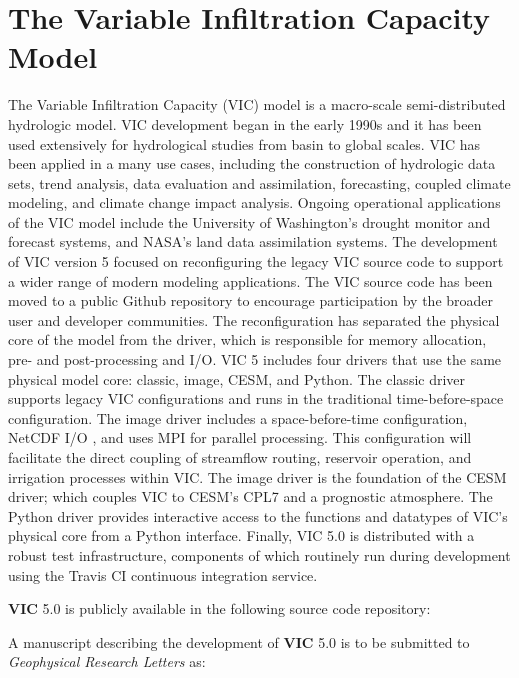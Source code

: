 \section{The Variable Infiltration Capacity Model}
\label{sec:vic_dev}
The Variable Infiltration Capacity (VIC) model is a macro-scale semi-distributed hydrologic model.
VIC development began in the early 1990s and it has been used extensively for hydrological studies from basin to global scales.
VIC has been applied in a many use cases, including the construction of hydrologic data sets, trend analysis, data evaluation and assimilation, forecasting, coupled climate modeling, and climate change impact analysis.
Ongoing operational applications of the VIC model include the University of Washington's drought monitor and forecast systems, and NASA's land data assimilation systems.
The development of VIC version 5 focused on reconfiguring the legacy VIC source code to support a wider range of modern modeling applications.
The VIC source code has been moved to a public Github repository to encourage participation by the broader user and developer communities.
The reconfiguration has separated the physical core of the model from the driver, which is responsible for memory allocation, pre- and post-processing and I/O.
VIC 5 includes four drivers that use the same physical model core: classic, image, CESM, and Python.
The classic driver supports legacy VIC configurations and runs in the traditional time-before-space configuration.
The image driver includes a space-before-time configuration, NetCDF I/O \citep{Rew_1990}, and uses MPI for parallel processing.
This configuration will facilitate the direct coupling of streamflow routing, reservoir operation, and irrigation processes within VIC.
The image driver is the foundation of the CESM driver; which couples VIC to CESM's CPL7 \citep{Craig_2012} and a prognostic atmosphere.
The Python driver provides interactive access to the functions and datatypes of VIC's physical core from a Python interface.
Finally, VIC 5.0 is distributed with a robust test infrastructure, components of which routinely run during development using the Travis CI continuous integration service.

\textbf{VIC} 5.0 is publicly available in the following source code repository:


A manuscript describing the development of \textbf{VIC} 5.0 is to be submitted to \textit{Geophysical Research Letters} as:


